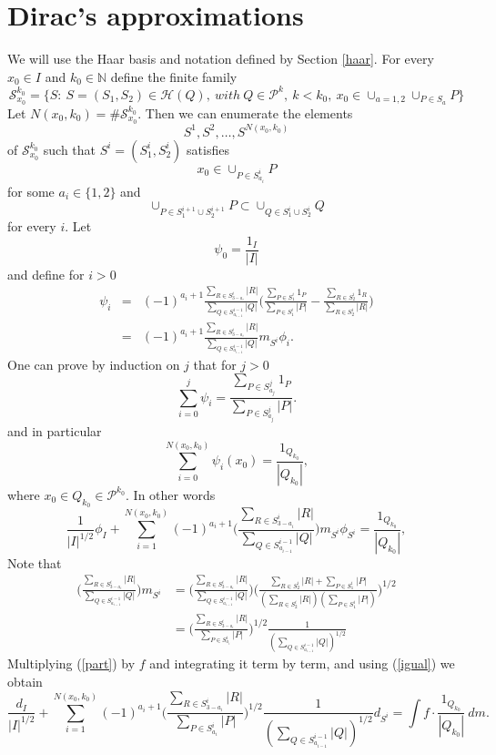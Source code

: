 \documentclass{amsart}
\theoremstyle{definition}
\begin{document}
\section{Dirac's approximations} 
We will use the Haar basis and notation defined by Section \ref{haar}. For every $x_0 \in I$ and $k_0 \in \mathbb{N}$  define the finite family 
$$\mathcal{S}_{x_0}^{k_0} =   \{ S \colon \ S=(S_1,S_2) \in \mathcal{H}(Q),\ with \ Q \in \mathcal{P}^k, \ k < k_0, \ x_0 \in \cup_{a=1,2} \cup_{P \in S_{a}} P   \}$$
Let $N(x_0,k_0)=\# \mathcal{S}_{x_0}^{k_0}$. Then we can enumerate the elements $$S^1, S^2, \dots, S^{N(x_0,k_0)}$$ of $\mathcal{S}_{x_0}^{k_0}$ 
such that $S^i=(S^i_1,S^i_2)$ satisfies
$$x_0 \in \cup_{P \in S^i_{a_i}} P $$
for some $a_i \in \{1,2\}$ and
$$\cup_{P \in S^{i+1}_1\cup S^{i+1}_2} P     \subset \cup_{Q \in S^{i}_1\cup S^{i}_2} Q$$ 
for every $i$. 
Let 
$$\psi_0    =   \frac{1_{I}}{|I|}$$
and define for $i >0$ 
\begin{eqnarray*}
\psi_{i}&=& (-1)^{a_{i}+1}\frac{\sum_{R \in S^{i}_{3-a_{i}}}|R|}{\sum_{Q \in S^{i-1}_{a_{i-1}}} |Q|} \big( \frac{ \sum_{P \in S^{i}_1}1_{P}}{\sum_{P \in S^{i}_1}|P|} -  \frac{ \sum_{R \in S^{i}_2}1_{R}}{\sum_{R \in S^{i}_2}|R|} \big)  \\
&=&   (-1)^{a_{i}+1} \frac{\sum_{R \in S^{i}_{3-a_{i}}}|R|}{\sum_{Q \in S^{i-1}_{a_{i-1}}} |Q|} m_{S^i} \phi_i.
\end{eqnarray*}
One can prove by induction on $j$ that for $j > 0$
$$\sum_{i=0}^j  \psi_i = \frac{\sum_{P \in S^{j}_{a_j}}1_{P} }{\sum_{P \in S^{j}_{a_j}}|P|}.$$
and in particular 
$$\sum_{i=0}^{N(x_0,k_0)}  \psi_i (x_0)= \frac{1_{Q_{k_0}} }{|Q_{k_0}|},$$
where $x_0 \in Q_{k_0} \in \mathcal{P}^{k_0}.$ In other words 
\begin{equation}\label{part}  \frac{1}{ |I|^{1/2} }\phi_{I} + \sum_{i=1}^{N(x_0,k_0)}  (-1)^{a_i+1}  \Big( \frac{\sum_{R \in S^{i}_{3-a_i}}|R|}{\sum_{Q \in S^{i-1}_{a_{i-1}}} |Q|}  \Big)  m_{S^i}    \phi_{S^i}=\frac{1_{Q_{k_0}} }{|Q_{k_0}|},\end{equation}  
Note that 
\begin{align}
\Big( \frac{\sum_{R \in S^{i}_{3-a_i}}|R|}{\sum_{Q \in S^{i-1}_{a_{i-1}}} |Q|}  \Big) m_{S^i}&= \Big( \frac{\sum_{R \in S^{i}_{3-a_i}}|R|}{\sum_{Q \in S^{i-1}_{a_{i-1}}} |Q|}  \Big) \Big(    \frac{\sum_{R \in S_2^i} |R| + \sum_{P \in S_1^i} |P|  }{(\sum_{R \in S_2^i} |R| ) (\sum_{P \in S_1^i} |P|)}   \Big)^{1/2} \nonumber \\
\label{igual} &= \Big( \frac{\sum_{R \in S^{i}_{3-a_i}}|R|}{\sum_{P \in S^{i}_{a_i}} |P|}  \Big)^{1/2}  \frac{1}{(\sum_{Q \in S^{i-1}_{a_{i-1}}} |Q|)^{1/2}}  
\end{align}
Multiplying (\ref{part}) by $f$ and integrating it  term by term, and using (\ref{igual}) we obtain 
$$\frac{d_{I}}{|I|^{1/2}} + \sum_{i=1}^{N(x_0,k_0)}  (-1)^{a_i+1}  \Big( \frac{\sum_{R \in S^{i}_{3-a_i}}|R|}{\sum_{P \in S^{i}_{a_i}} |P|}  \Big)^{1/2}  \frac{1}{(\sum_{Q \in S^{i-1}_{a_{i-1}}} |Q|)^{1/2}}    d _{S^i} =\int f \cdot \frac{1_{Q_{k_0}}}{|Q_{k_0}|} \ dm.$$
\end{document}
